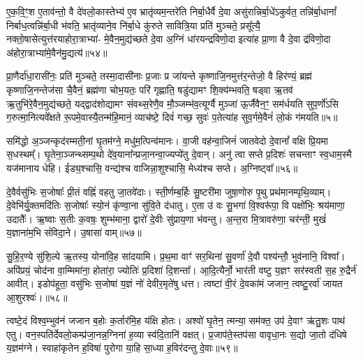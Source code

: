 ए॒क॒वि॒ꣳ॒श ए॒ताव॑न्तो॒ वै दे॑वलो॒कास्तेभ्य॑ ए॒व भ्रातृ॑व्यम॒न्तरे॑ति निर्बा॒धैर्वै दे॒वा असु॑रान्निर्बा॒धे॑\-ऽकुर्वत॒ तन्नि॑र्बा॒धानां᳚ निर्बाध॒त्वन्नि॑र्बा॒धी भ॑वति॒ भ्रातृ॑व्याने॒व नि॑र्बा॒धे कु॑रुते सावित्रि॒या प्रति॑ मुञ्चते॒ प्रसू᳚त्यै॒ नक्तो॒षासेत्युत्त॑रयाहोरा॒त्राभ्या॑- मे॒वैन॒मुद्य॑च्छते दे॒वा अ॒ग्निं धा॑रयन्द्रविणो॒दा इत्या॑ह प्रा॒णा वै दे॒वा द्र॑विणो॒दा अ॑होरा॒त्राभ्या॑मे॒वैन॑मु॒द्यत्य॑॥५४॥

प्रा॒णैर्दा॑धा॒रासी॑नः॒ प्रति॑ मुञ्चते॒ तस्मा॒दासी॑नाः प्र॒जाः प्र जा॑यन्ते कृष्णाजि॒नमुत्त॑र॒न्तेजो॒ वै हिर॑ण्यं॒ ब्रह्म॑ कृष्णाजि॒नन्तेज॑सा चै॒वैनं॒ ब्रह्म॑णा चोभ॒यतः॒ परि॑ गृह्णाति॒ षडु॑द्यामꣳ शि॒क्य॑म्भवति॒ षड्वा ऋ॒तव॑ ऋ॒तुभि॑रे॒वैन॒मुद्य॑च्छते॒ यद्द्वाद॑शोद्यामꣳ संवथ्स॒रेणै॒व मौ॒ञ्जम्भ॑व॒त्यूर्ग्वै मुञ्जा॑ ऊ॒र्जैवैन॒ꣳ॒ सम॑र्धयति सुप॒र्णो॑\-ऽसि ग॒रुत्मा॒नित्यवे᳚क्षते रू॒पमे॒वास्यै॒तन्म॑हि॒मानं॒ व्याच॑ष्टे॒ दिवं॑ गच्छ॒ सुवः॑ प॒तेत्या॑ह सुव॒र्गमे॒वैनं॑ लो॒कं ग॑मयति॥५॥

{\anuvakamend[{रक्षा॒ꣳ॒स्यौदु॑म्बरी आदि॒त्य उ॒द्यत्य॒ स़ञ्चतु॑र्विꣳशतिश्च॥10॥}]}

समि॑द्धो अ॒ञ्जन्कृद॑रम्मती॒नां घृ॒तम॑ग्ने॒ मधु॑म॒त्पिन्व॑मानः। वा॒जी वह॑न्वा॒जिनं॑ जातवेदो दे॒वानां᳚ वक्षि प्रि॒यमा स॒धस्थम्᳚। घृ॒तेना॒ञ्जन्थ्सम्प॒थो दे॑व॒याना᳚न्प्रजा॒नन्वा॒ज्यप्ये॑तु दे॒वान्। अनु॑ त्वा सप्ते प्र॒दिशः॑ सचन्ताꣳ स्व॒धाम॒स्मै यज॑मानाय धेहि। ईड्य॒श्चासि॒ वन्द्य॑श्च वाजिन्ना॒शुश्चासि॒ मेध्य॑श्च सप्ते। अ॒ग्निष्ट्वा᳚॥५६॥

दे॒वैर्वसु॑भिः स॒जोषाः᳚ प्री॒तं वह्निं॑ वहतु जा॒तवे॑दाः। स्ती॒र्णम्ब॒र्\mbox{}हिः सु॒ष्टरी॑मा जुषा॒णोरु पृ॒थु प्रथ॑मानम्पृथि॒व्याम्। दे॒वेभि॑र्यु॒क्तमदि॑तिः स॒जोषाः᳚ स्यो॒नं कृ॑ण्वा॒ना सु॑वि॒ते द॑धातु। ए॒ता उ॑ वः सु॒भगा॑ वि॒श्वरू॑पा॒ वि पक्षो॑भिः॒ श्रय॑माणा॒ उदातैः᳚। ऋ॒ष्वाः स॒तीः क॒वषः॒ शुम्भ॑माना॒ द्वारो॑ दे॒वीः सु॑प्राय॒णा भ॑वन्तु। अ॒न्त॒रा मि॒त्रावरु॑णा॒ चर॑न्ती॒ मुखं॑ य॒ज्ञाना॑म॒भि सं॑विदा॒ने। उ॒षासा॑ वाम्॥५७॥

सु॒हि॒र॒ण्ये सु॑शि॒ल्पे ऋ॒तस्य॒ योना॑वि॒ह सा॑दयामि। प्र॒थ॒मा वाꣳ॑ सर॒थिना॑ सु॒वर्णा॑ दे॒वौ पश्य॑न्तौ॒ भुव॑नानि॒ विश्वा᳚। अपि॑प्रयं॒ चोद॑ना वा॒म्मिमा॑ना॒ होता॑रा॒ ज्योतिः॑ प्र॒दिशा॑ दि॒शन्ता᳚। आ॒दि॒त्यैर्नो॒ भार॑ती वष्टु य॒ज्ञꣳ सर॑स्वती स॒ह रु॒द्रैर्न॑ आवीत्। इडोप॑हूता॒ वसु॑भिः स॒जोषा॑ य॒ज्ञं नो॑ देवीर॒मृते॑षु धत्त। त्वष्टा॑ वी॒रं दे॒वका॑मं जजान॒ त्वष्टु॒रर्वा॑ जायत आ॒शुरश्वः॑।॥५८॥

त्वष्टे॒दं विश्व॒म्भुव॑नं जजान ब॒होः क॒र्तार॑मि॒ह य॑क्षि होतः। अश्वो॑ घृ॒तेन॒ त्मन्या॒ सम॑क्त॒ उप॑ दे॒वाꣳ ऋ॑तु॒शः पाथ॑ एतु। वन॒स्पति॑र्देवलो॒कम्प्र॑जा॒नन्न॒ग्निना॑ ह॒व्या स्व॑दि॒तानि॑ वक्षत्। प्र॒जाप॑ते॒स्तप॑सा वावृधा॒नः स॒द्यो जा॒तो द॑धिषे य॒ज्ञम॑ग्ने। स्वाहा॑कृतेन ह॒विषा॑ पुरोगा या॒हि सा॒ध्या ह॒विर॑दन्तु दे॒वाः॥५९॥

